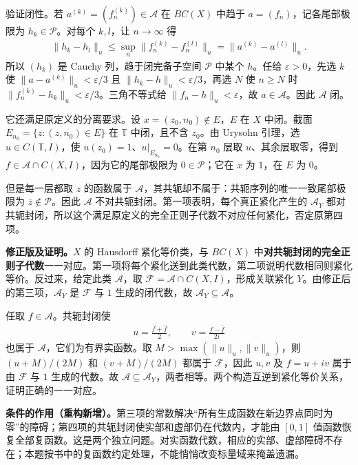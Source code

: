 \documentclass[../../main.tex]{subfiles}
\begin{document}
\begin{solution}
\begin{enumerate}
验证闭性。若 $a^{(k)}=(f_n^{(k)})\in\mathcal A$ 在 $BC(X)$ 中趋于 $a=(f_n)$，记各尾部极限为 $h_k\in\mathcal P$。对每个 $k,l$，让 $n\to\infty$ 得
\begin{align*}
\|h_k-h_l\|_u\le\sup_n\|f_n^{(k)}-f_n^{(l)}\|_u
=\|a^{(k)}-a^{(l)}\|_u.
\end{align*}
所以 $(h_k)$ 是 Cauchy 列，趋于闭完备子空间 $\mathcal P$ 中某个 $h$。任给 $\varepsilon>0$，先选 $k$ 使 $\|a-a^{(k)}\|_u<\varepsilon/3$ 且 $\|h_k-h\|_u<\varepsilon/3$，再选 $N$ 使 $n\ge N$ 时 $\|f_n^{(k)}-h_k\|_u<\varepsilon/3$。三角不等式给 $\|f_n-h\|_u<\varepsilon$，故 $a\in\mathcal A$。因此 $\mathcal A$ 闭。

它还满足原定义的分离要求。设 $x=(z_0,n_0)\notin E$，$E$ 在 $X$ 中闭。截面 $E_{n_0}=\{z:(z,n_0)\in E\}$ 在 $\mathbb T$ 中闭，且不含 $z_0$。由 Urysohn 引理，选 $u\in C(\mathbb T,I)$，使 $u(z_0)=1$、$u|_{E_{n_0}}=0$。在第 $n_0$ 层取 $u$、其余层取零，得到 $f\in\mathcal A\cap C(X,I)$，因为它的尾部极限为 $0\in\mathcal P$；它在 $x$ 为 $1$，在 $E$ 为 $0$。

但是每一层都取 $z$ 的函数属于 $\mathcal A$，其共轭却不属于：共轭序列的唯一一致尾部极限为 $\overline z\notin\mathcal P$。因此 $\mathcal A$ 不对共轭封闭。第一项表明，每个真正紧化产生的 $\mathcal A_Y$ 都对共轭封闭，所以这个满足原定义的完全正则子代数不对应任何紧化，否定原第四项。

\textbf{修正版及证明。}$X$ 的 Hausdorff 紧化等价类，与 $BC(X)$ 中\textbf{对共轭封闭的完全正则子代数}一一对应。第一项将每个紧化送到此类代数，第二项说明代数相同则紧化等价。反过来，给定此类 $\mathcal A$，取 $\mathcal F=\mathcal A\cap C(X,I)$，形成关联紧化 $Y$。由修正后的第三项，$\mathcal A_Y$ 是 $\mathcal F$ 与 $1$ 生成的闭代数，故 $\mathcal A_Y\subseteq\mathcal A$。

任取 $f\in\mathcal A$。共轭封闭使
\begin{align*}
u=\frac{f+\overline f}{2},\qquad
v=\frac{f-\overline f}{2i}
\end{align*}
也属于 $\mathcal A$，它们为有界实函数。取 $M>\max(\|u\|_u,\|v\|_u)$，则 $(u+M)/(2M)$ 和 $(v+M)/(2M)$ 都属于 $\mathcal F$，因此 $u,v$ 及 $f=u+iv$ 属于由 $\mathcal F$ 与 $1$ 生成的代数。故 $\mathcal A\subseteq\mathcal A_Y$，两者相等。两个构造互逆到紧化等价关系，证明正确的一一对应。
\end{enumerate}
\end{solution}
\begin{remark}
\textbf{条件的作用（重构新增）。}第三项的常数解决“所有生成函数在新边界点同时为零”的障碍；第四项的共轭封闭使实部和虚部仍在代数内，才能由 $[0,1]$ 值函数恢复全部复函数。这是两个独立问题。对实函数代数，相应的实部、虚部障碍不存在；本题按书中的复函数约定处理，不能悄悄改变标量域来掩盖遗漏。
\end{remark}
\end{document}
